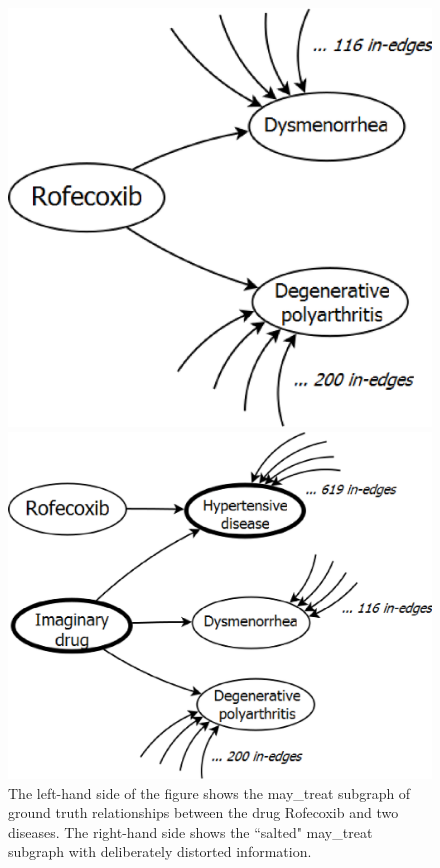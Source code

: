 \documentclass{article}
\begin{document}
\begin{figure}[tbh]
\begin{minipage}[c]{0.49\textwidth}\centering
\includegraphics[width=.7\textwidth]{fig/may_treat.eps}
\end{minipage}
\begin{minipage}[c]{0.49\textwidth}\centering
\includegraphics[width=.9\textwidth]{fig/may_treat_augmented.eps}
\end{minipage}
\caption[The may\_treat subgraph]{\label{fig:may_treat} The left-hand side of the figure shows the may\_treat subgraph of ground truth relationships between the drug Rofecoxib and two diseases. The right-hand side shows the ``salted" may\_treat subgraph with deliberately distorted information.}
\end{figure}
\end{document}
